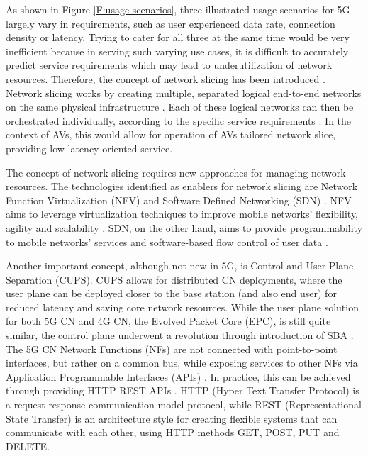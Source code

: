 \documentclass[12pt,a4paper,twoside]{report}
\begin{document}
As shown in Figure \ref{F:usage-scenarios}, three illustrated usage scenarios for 5G largely vary in requirements, such as user experienced data rate, connection density or latency. Trying to cater for all three at the same time would be very inefficient because in serving such varying use cases, it is difficult to accurately predict service requirements which may lead to underutilization of network resources. Therefore, the concept of network slicing has been introduced \cite{yousaf2017nfv}. Network slicing works by creating multiple, separated logical end-to-end networks on the same physical infrastructure \cite{yousaf2017nfv}. Each of these logical networks can then be orchestrated individually, according to the specific service requirements \cite{yousaf2017nfv}. In the context of AVs, this would allow for operation of AVs tailored network slice, providing low latency-oriented service.

The concept of network slicing requires new approaches for managing network resources. The technologies identified as enablers for network slicing are Network Function Virtualization (NFV) and Software Defined Networking (SDN) \cite{yousaf2017nfv}. NFV aims to leverage virtualization techniques to improve mobile networks’ flexibility, agility and scalability \cite{yousaf2017nfv}. SDN, on the other hand, aims to provide programmability to mobile networks’ services and software-based flow control of user data \cite{yousaf2017nfv}.
  
Another important concept, although not new in 5G, is Control and User Plane Separation (CUPS). CUPS allows for distributed CN deployments, where the user plane can be deployed closer to the base station (and also end user) for reduced latency and saving core network resources. While the user plane solution for both 5G CN and 4G CN, the Evolved Packet Core (EPC), is still quite similar, the control plane underwent a revolution through introduction of SBA \cite{rommer20195g}. The 5G CN Network Functions (NFs) are not connected with point-to-point interfaces, but rather on a common bus, while exposing services to other NFs via Application Programmable Interfaces (APIs) \cite{rommer20195g}. In practice, this can be achieved through providing HTTP REST APIs \cite{sabella-mec-sw-dev,rommer20195g}. HTTP (Hyper Text Transfer Protocol) is a request response communication model protocol, while REST (Representational State Transfer) is an architecture style for creating flexible systems that can communicate with each other, using HTTP methods GET, POST, PUT and DELETE.
\end{document}
